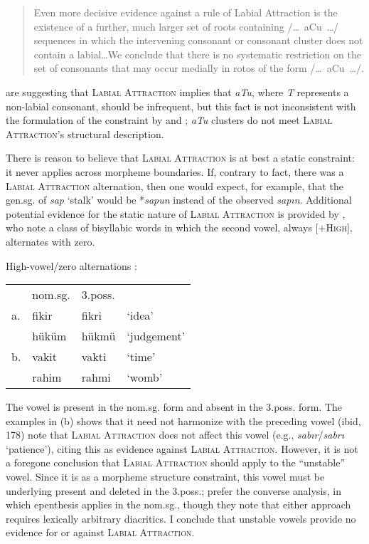 \begin{quotation}
Even more decisive evidence against a rule of Labial Attraction is the existence of a further, much larger set of roots containing /\ldots~aCu~\ldots/ sequences in which the intervening consonant or consonant cluster does not contain a labial\ldots We conclude that there is no systematic restriction on the set of consonants that may occur medially in rotos of the form /\ldots~aCu~\ldots/. \citep[][225]{Clements1982}
\end{quotation}

\noindent
\citeauthor{Clements1982} are suggesting that \textsc{Labial Attraction} implies that \emph{aTu}, where \emph{T} represents a non-labial consonant, should be infrequent, but this fact is not inconsistent with the formulation of the constraint by \citet{Lees1966a,Lees1966b} and \citet{Zimmer1969}; \emph{aTu} clusters do not meet \textsc{Labial Attraction}'s structural description.

There is reason to believe that \textsc{Labial Attraction} is at best a static constraint: it never applies across morpheme boundaries. If, contrary to fact, there was a \textsc{Labial Attraction} alternation, then one would expect, for example, that the gen.sg. of \emph{sap} `stalk' would be *\emph{sapun} instead of the observed \emph{sapın}. Additional potential evidence for the static nature of \textsc{Labial Attraction} is provided by \citeauthor{Clements1982}, who note a class of bisyllabic words in which the second vowel, always [$+$\textsc{High}], alternates with zero. 

\ex High-vowel/zero alternations \citep[][243]{Clements1982}: \\
\begin{tabular}{l l l l}
   & nom.sg. & 3.poss. \\
a. & fikir   & fikri & `idea' \\ 
   & hüküm   & hükmü & `judgement' \\ 
b. & vakit  & vakti  & `time' \\
   & rahim  & rahmi  & `womb' \\
\end{tabular}
\xe

\noindent 
The vowel is present in the nom.sg. form and absent in the 3.poss. form. The examples in (\lastx b) shows that it need not harmonize with the preceding vowel
\citeauthor{Inkelas2001} (ibid, 178) note that \textsc{Labial Attraction} does not affect this vowel (e.g., \emph{sabır}/\emph{sabrı} `patience'), citing this as evidence against \textsc{Labial Attraction}. However, it is not a foregone conclusion that \textsc{Labial Attraction} should apply to the ``unstable'' vowel. Since it is as a morpheme structure constraint, this vowel must be underlying present and deleted in the 3.poss.; \citeauthor{Clements1982} prefer the converse analysis, in which epenthesis applies in the nom.sg., though they note that either approach requires lexically arbitrary diacritics. I conclude that unstable vowels provide no evidence for or against \textsc{Labial Attraction}.


